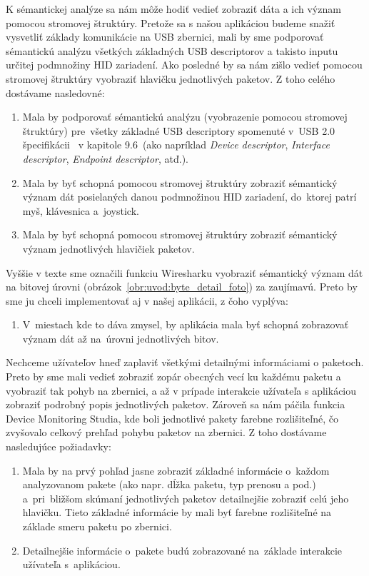 K sémantickej analýze sa nám môže hodiť vedieť zobraziť dáta a ich význam pomocou stromovej štruktúry. Pretože sa s našou aplikáciou budeme snažiť vysvetliť základy komunikácie na USB zbernici, mali by sme podporovať sémantickú analýzu všetkých základných USB descriptorov a takisto inputu určitej podmnožiny HID zariadení. Ako posledné by sa nám zišlo vedieť pomocou stromovej štruktúry vyobraziť hlavičku jednotlivých paketov. Z toho celého dostávame nasledovné:
\begin{enumerate}[label=\textbf{P\arabic*},resume]
	\item \label{uvod:poz:descriptory} Mala by podporovať sémantickú analýzu (vyobrazenie pomocou stromovej štruktúry) pre~všetky základné USB descriptory spomenuté v~USB 2.0 špecifikácii~\cite{usbdoc} v kapitole 9.6~(ako napríklad \textit{Device descriptor}, \textit{Interface descriptor}, \textit{Endpoint descriptor}, atď.).
	\item \label{uvod:poz:hid_analyza} Mala by byť schopná pomocou stromovej štruktúry zobraziť sémantický význam dát posielaných danou podmnožinou HID zariadení, do~ktorej patrí myš, klávesnica a~joystick.
	\item \label{uvod:poz:paket_hlavicka} Mala by byť schopná pomocou stromovej štruktúry zobraziť sémantický význam jednotlivých hlavičiek paketov.
\end{enumerate}

Vyššie v texte sme označili funkciu Wiresharku vyobraziť sémantický význam dát na bitovej úrovni (obrázok~\ref{obr:uvod:byte_detail_foto}) za zaujímavú. Preto by sme ju chceli implementovať aj v našej aplikácii, z čoho vyplýva:
\begin{enumerate}[label=\textbf{P\arabic*},resume]
\item \label{uvod:poz:show_bits} V~miestach kde to dáva zmysel, by aplikácia mala byť schopná zobrazovať význam dát až na~úrovni jednotlivých bitov.
\end{enumerate}

Nechceme užívateľov hneď zaplaviť všetkými detailnými informáciami o paketoch. Preto by sme mali vedieť zobraziť zopár obecných vecí ku každému paketu a vyobraziť tak pohyb na zbernici, a až v prípade interakcie užívateľa s aplikáciou zobraziť podrobný popis jednotlivých paketov. Zároveň sa nám páčila funkcia Device Monitoring Studia, kde boli jednotlivé pakety farebne rozlišiteľné, čo zvyšovalo celkový prehľad pohybu paketov na zbernici. Z toho dostávame nasledujúce požiadavky:
\begin{enumerate}[label=\textbf{P\arabic*},resume]
	\item \label{uvod:poz:zobrazenie_paketov} Mala by na prvý pohľad jasne zobraziť základné informácie o~každom analyzovanom pakete (ako napr. dĺžka paketu, typ prenosu a pod.) a~pri~bližšom skúmaní jednotlivých paketov detailnejšie zobraziť celú jeho hlavičku. Tieto základné informácie by mali byť farebne rozlišiteľné na základe smeru paketu po zbernici.
	\item \label{uvod:poz:paket_detail} Detailnejšie informácie o~pakete budú zobrazované na~základe interakcie užívateľa s~aplikáciou.
\end{enumerate}

